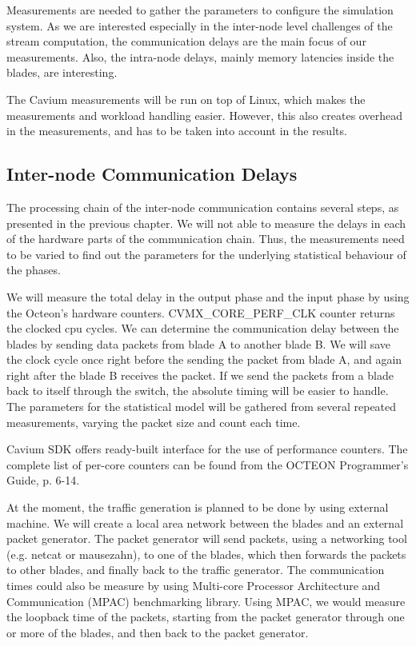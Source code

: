 Measurements are needed to gather the parameters to configure the simulation system. As we are interested especially in the inter-node level challenges of the stream computation, the communication delays are the main focus of our measurements. Also, the intra-node delays, mainly memory latencies inside the blades, are interesting.

The Cavium measurements will be run on top of Linux, which makes the measurements and workload handling easier. However, this also creates overhead in the measurements, and has to be taken into account in the results.

\subsection{Inter-node Communication Delays}
The processing chain of the inter-node communication contains several steps, as presented in the previous chapter. We will not able to measure the delays in each of the hardware parts of the communication chain. Thus, the measurements need to be varied to find out the parameters for the underlying statistical behaviour of the phases.

We will measure the total delay in the output phase and the input phase by using the Octeon's hardware counters. CVMX\_CORE\_PERF\_CLK counter returns the clocked cpu cycles. We can determine the communication delay between the blades by sending data packets from blade A to another blade B. We will save the clock cycle once right before the sending the packet from blade A, and again right after the blade B receives the packet. If we send the packets from a blade back to itself through the switch, the absolute timing will be easier to handle. The parameters for the statistical model will be gathered from several repeated measurements, varying the packet size and count each time.

Cavium SDK offers ready-built interface for the use of performance counters. The complete list of per-core counters can be found from the OCTEON Programmer's Guide, p. 6-14.

At the moment, the traffic generation is planned to be done by using external machine. We will create a local area network between the blades and an external packet generator. The packet generator will send packets, using a networking tool (e.g. netcat or mausezahn), to one of the blades, which then forwards the packets to other blades, and finally back to the traffic generator. The communication times could also be measure by using Multi-core Processor Architecture and Communication (MPAC) benchmarking library. Using MPAC, we would measure the loopback time of the packets, starting from the packet generator through one or more of the blades, and then back to the packet generator.

